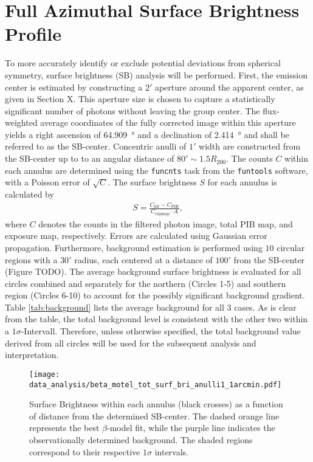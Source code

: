 \section{Full Azimuthal Surface Brightness Profile}\label{sec:full_az}
To more accurately identify or exclude potential deviations from spherical symmetry, surface brightness (SB) analysis will be performed. First, the emission center is estimated by constructing a \(2'\) aperture around the apparent center, as given in Section X. This aperture size is chosen to capture a statistically significant number of photons without leaving the group center. The flux-weighted average coordinates of the fully corrected image within this aperture yields a right ascension of \SI{64.909}{\degree} and a declination of \SI{2.414}{\degree} and shall be referred to as the SB-center. Concentric anulli of \(1'\) width are constructed from the SB-center up to to an angular distance of \(80' \sim 1.5R_{200}\). The counts \(C\) within each annulus are determined using the \texttt{funcnts} task from the \texttt{funtools} software, with a Poisson error of \(\sqrt{C}\). The surface brightness \(S\) for each annulus is calculated by
\begin{align*}
    S = \frac{C_\text{filt} - C_\text{PIB}}{C_\text{expmap}\cdot A},
\end{align*}
where \(C\) denotes the counts in the filtered photon image, total PIB map, and exposure map, respectively. Errors are calculated using Gaussian error propagation. Furthermore, background estimation is performed using \(10\) circular regions with a \(30'\) radius, each centered at a distance of \(100'\) from the SB-center (Figure TODO). The average background surface brightness is evaluated for all circles combined and separately for the northern (Circles 1-5) and southern region (Circles 6-10) to account for the possibly significant background gradient. Table \ref{tab:background} lists the average background for all 3 cases. As is clear from the table, the total background level is consistent with the other two within a \(1\sigma\)-Intervall. Therefore, unless otherwise specified, the total background value derived from all circles will be used for the subsequent analysis and interpretation.
%
\begin{figure}[htbp]
    \centering
    \texttt{[image: data\_analysis/beta\_motel\_tot\_surf\_bri\_anulli1\_1arcmin.pdf]}
    \caption{Surface Brightness within each annulus (black crosses) as a function of distance from the determined SB-center. The dashed orange line represents the best \(\beta\)-model fit, while the purple line indicates the observationally determined background. The shaded regions correspond to their respective \(1\sigma\) intervals.}
    \label{fig:tot_azimuthal_beta_model}
\end{figure}
